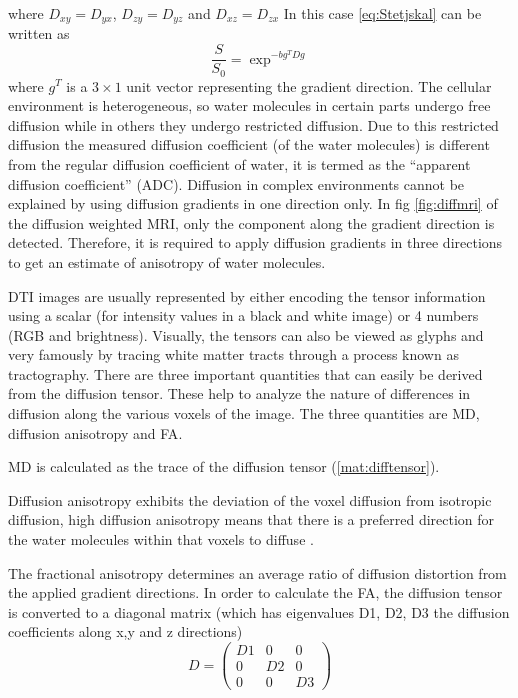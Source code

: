 \documentclass[msthesis.tex]{subfiles}
\begin{document}
where $D_{xy} = D_{yx}$, $D_{zy}=D_{yz}$ and $D_{xz}=D_{zx}$
In this case \autoref{eq:Stetjskal} can be written as 
\begin{equation}
\frac{S}{S_0} = \exp^{-bg^T Dg}
\end{equation}where $g^T$ is a $3 \times 1$ unit vector representing the gradient direction.
The cellular environment is heterogeneous, so water molecules in certain parts undergo free diffusion while in others they undergo restricted diffusion. Due to this restricted diffusion the measured diffusion coefficient (of the water molecules) is different from the regular diffusion coefficient of water, it is termed as the “apparent diffusion coefficient” (ADC). Diffusion in complex environments cannot be explained by using diffusion gradients in one direction only. In fig \autoref{fig:diffmri} of the diffusion weighted MRI, only the component along the gradient direction is detected. Therefore, it is required to apply diffusion gradients in three directions to get an estimate of anisotropy of water molecules. 

\gls{DTI} images are usually represented by either encoding the tensor information using a scalar (for intensity values in a black and white image) or 4 numbers (\gls{RGB} and brightness). Visually, the tensors can also be viewed as glyphs and very famously by tracing white matter tracts through a process known as tractography. There are three important quantities that can easily be derived from the diffusion tensor. These help to analyze the nature of differences in diffusion along the various voxels of the image. The three quantities are \gls{MD}, diffusion anisotropy and  \gls{FA}. 

\gls{MD} is calculated as the trace of the diffusion tensor (\autoref{mat:difftensor}).

Diffusion anisotropy exhibits the deviation of the voxel diffusion from isotropic diffusion, high diffusion anisotropy means that there is a preferred direction for the water molecules within that voxels to diffuse \citep{clark2011mean}. 

The fractional anisotropy determines an average ratio of diffusion distortion from the applied gradient directions. In order to calculate the FA, the diffusion tensor is converted to a diagonal matrix (which has eigenvalues D1, D2, D3 the diffusion coefficients along x,y and z directions) \\
\begin{equation*}
D =
 \begin{pmatrix}
D1 & 0 & 0 \\
0 & D2 & 0 \\
0 & 0 & D3
\end{pmatrix}   
\end{equation*}
\end{document}
